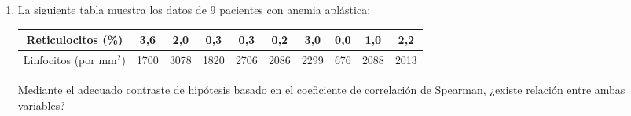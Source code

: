 \begin{enumerate}[leftmargin=*]
\item La siguiente tabla muestra los datos de 9 pacientes con anemia aplástica:
\begin{center}
\begin{tabular}{|l|l|l|l|l|l|l|l|l|l|}
\hline
\multicolumn{1}{|c|}{Reticulocitos (\%)} & \multicolumn{1}{c|}{3,6} & \multicolumn{1}{c|}{2,0} & \multicolumn{1}{c|}{0,3} & \multicolumn{1}{c|}{0,3} & \multicolumn{1}{c|}{0,2} & \multicolumn{1}{c|}{3,0} & \multicolumn{1}{c|}{0,0} & \multicolumn{1}{c|}{1,0} & \multicolumn{1}{c|}{2,2} \\
\hline
\multicolumn{1}{|c|}{Linfocitos (por mm$^2$)} & \multicolumn{1}{c|}{1700} & \multicolumn{1}{c|}{3078} & \multicolumn{1}{c|}{1820} & \multicolumn{1}{c|}{2706} & \multicolumn{1}{c|}{2086} & \multicolumn{1}{c|}{2299} & \multicolumn{1}{c|}{676} & \multicolumn{1}{c|}{2088} & \multicolumn{1}{c|}{2013} \\
\hline
\end{tabular}
\end{center}

Mediante el adecuado contraste de hipótesis basado en el coeficiente de correlación de Spearman, ¿existe relación entre
ambas variables?

\end{enumerate}